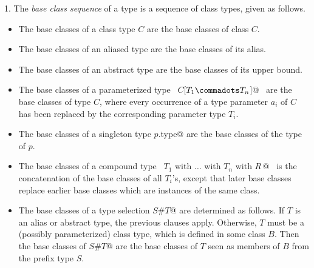 \documentclass[a4paper,12pt,twoside,titlepage]{book}
\begin{document}
1. The {\em base class sequence} of a type is a sequence of class types, 
given as follows.
\begin{itemize}
\item
The base classes of a class type $C$ are the base classes of class
$C$.
\item
The base classes of an aliased type are the base classes of its alias.
\item
The base classes of an abstract type are the base classes of its upper bound.
\item
The base classes of a parameterized type 
~\lstinline@$C$[$T_1 \commadots T_n$]@~ are the base classes
of type $C$, where every occurrence of a type parameter $a_i$ 
of $C$ has been replaced by the corresponding parameter type $T_i$.
\item
The base classes of a singleton type \lstinline@$p$.type@ are the base classes of
the type of $p$.
\item
The base classes of a compound type
~\lstinline@$T_1$ with $\ldots$ with $T_n$ with {$R\,$}@~ is the concatenation of the
base classes of all $T_i$'s, except that later base classes replace
earlier base classes which are instances of the same class.
\item
The base classes of a type selection \lstinline@$S$#$T$@ are
determined as follows. If $T$ is an alias or abstract type, the
previous clauses apply. Otherwise, $T$ must be a (possibly
parameterized) class type, which is defined in some class $B$.  Then
the base classes of \lstinline@$S$#$T$@ are the base classes of $T$
seen as members of $B$ from the prefix type $S$.

\end{itemize}
\end{document}
